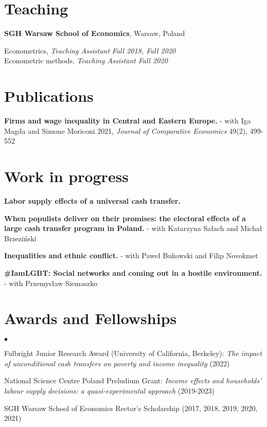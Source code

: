 \documentclass[margin,line]{res}
\newenvironment{list2}{
  \begin{list}{$\bullet$}{%
      \setlength{\itemsep}{0in}
      \setlength{\parsep}{0in} \setlength{\parskip}{0in}
      \setlength{\topsep}{0in} \setlength{\partopsep}{0in} 
      \setlength{\leftmargin}{0.2in}}}{\end{list}}
\begin{document}
\begin{resume}
\section{\sc Teaching}
{\bf SGH Warsaw School of Economics}, Warsaw, Poland

\vspace{-.3cm}
Econometrics, \textit{Teaching Assistant} \hfill \textit{Fall 2018, Fall 2020}\\
Econometric methods, \textit{Teaching Assistant} \hfill \textit{Fall 2020}\\
\vspace*{.05in}  

\section{\sc Publications}
\textbf{Firms and wage inequality in Central and Eastern Europe.} - with Iga Magda and Simone Moriconi 2021, \textit{Journal of Comparative Economics} 49(2), 499-552
\vspace*{.05in}  
\section{\sc Work in progress}

\textbf{Labor supply effects of a universal cash transfer. }

\textbf{When populists deliver on their promises: the electoral effects of a large cash transfer program in Poland.} - with Katarzyna Sałach and Michał Brzeziński

\textbf{Inequalities and ethnic conflict.} - with Paweł Bukowski and Filip Novokmet

\textbf{\#IamLGBT: Social networks and coming out in a hostile environment.} - with Przemysław Siemaszko
\vspace*{.05in}  
\section{\sc Awards and Fellowships} 
\begin{list2}
\item Fulbright Junior Research Award (University of California, Berkeley): \textit{The impact of unconditional cash transfers on poverty and income inequality} (2022)
\item National Science Centre Poland Preludium Grant: \textit{Income effects and households' labour supply decisions: a quasi-experimental approach} (2019-2023)
\item SGH Warsaw School of Economics Rector's Scholarship (2017, 2018, 2019, 2020, 2021)
\end{list2}
\vspace*{.05in} 

\end{resume}
\end{document}
